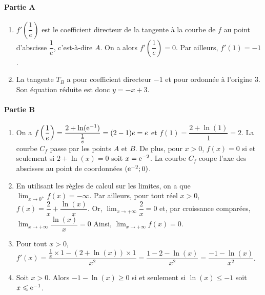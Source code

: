 \documentclass[11pt,fleqn, openany]{book} %
\begin{document}
\begin{solution}\hspace{0pt}


\paragraph{Partie A}

\begin{enumerate}
\item $f'\left(\dfrac{1}{e}\right)$ est le coefficient directeur de la tangente à la courbe de $f$ au point d'abscisse $\dfrac{1}{e}$, c'est-à-dire $A$. On a alors $f'\left(\dfrac{1}{e}\right)=0$. Par ailleurs, $f'(1)=-1$.
\item La tangente $T_B$ a pour coefficient directeur $-1$ et pour ordonnée à l'origine 3. Son équation réduite est donc $y=-x+3$.
\end{enumerate}

\paragraph{Partie B}

\begin{enumerate}
\item On a $f\left(\dfrac{1}{e}\right)=\dfrac{2+\ln(\mathrm{e}^{-1})}{\frac{1}{e}}=(2-1)e=e$ et $f(1)=\dfrac{2+\ln(1)}{1}=2$. La courbe $C_f$ passe par les points $A$ et $B$. De plus, pour $x>0$, $f(x)=0$ si et seulement si $2+\ln(x)=0$ soit $x=\mathrm{e}^{-2}$. La courbe $C_f$ coupe l'axe des abscisses au point de coordonnées $(\mathrm{e}^{-2};0)$.
\item En utilisant les règles de calcul sur les limites, on a que $\displaystyle\lim_{x\to 0^+}f(x)=-\infty$. Par ailleurs, pour tout réel $x>0$, $f(x)=\dfrac{2}{x}+\dfrac{\ln(x)}{x}$. Or, $\displaystyle\lim_{x\to+\infty}\dfrac{2}{x}=0$ et, par croissance comparées, $\displaystyle\lim_{x\to+\infty}\dfrac{\ln(x)}{x}=0$ Ainsi, $\displaystyle\lim_{x\to+\infty}f(x)=0$.
\item Pour tout $x>0$, $f'(x)=\dfrac{\frac{1}{x} \times 1 - (2+\ln(x))\times 1}{x^2}=\dfrac{1-2-\ln(x)}{x^2}=\dfrac{-1-\ln(x)}{x^2}$.

\item Soit $x>0$. Alors $-1-\ln(x)\geqslant 0$ si et seulement si $\ln(x) \leqslant -1$ soit $x\leqslant \mathrm{e}^{-1}$.
\begin{center}
\end{center}


\end{enumerate}
\end{solution}
\end{document}
